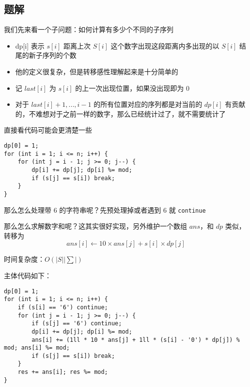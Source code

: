 \subsection{题解}
\begin{frame} %
我们先来看一个子问题：如何计算有多少个不同的子序列

\begin{itemize}
    \item dp[i] 表示 $s[i]$ 距离上次 $S[i]$ 这个数字出现这段距离内多出现的以 $S[i]$ 结尾的新子序列的个数
    \item 他的定义很复杂，但是转移感性理解起来是十分简单的
    \item 记 $last[i]$ 为 $s[i]$ 的上一次出现位置，如果没出现即为 $0$
    \item 对于 $last[i] + 1, ..., i - 1$ 的所有位置对应的序列都是对当前的 $dp[i]$ 有贡献的，不难想对于之前一样的数字，那么已经统计过了，就不需要统计了
\end{itemize}
\end{frame}


\begin{frame}[fragile]
直接看代码可能会更清楚一些

\begin{lstlisting}[style=C++]
dp[0] = 1;
for (int i = 1; i <= n; i++) {
    for (int j = i - 1; j >= 0; j--) {
        dp[i] += dp[j]; dp[i] %= mod;
        if (s[j] == s[i]) break;
    }
}
\end{lstlisting}
那么怎么处理带 $6$ 的字符串呢？先预处理掉或者遇到 $6$ 就 \texttt{continue}
\end{frame}


\begin{frame}
那么怎么求解数字和呢？这其实很好实现，另外维护一个数组 $ans$，和 $dp$ 类似，转移为
$$
ans[i]\leftarrow 10\times ans[j] + s[i]\times dp[j]
$$

时间复杂度：$O(|S||\sum|)$
\end{frame}


\begin{frame}[fragile]
主体代码如下：
\begin{lstlisting}[style=C++]
dp[0] = 1;
for (int i = 1; i <= n; i++) {
    if (s[i] == '6') continue;
    for (int j = i - 1; j >= 0; j--) {
        if (s[j] == '6') continue;
        dp[i] += dp[j]; dp[i] %= mod;
        ans[i] += (1ll * 10 * ans[j] + 1ll * (s[i] - '0') * dp[j]) % mod; ans[i] %= mod;
        if (s[j] == s[i]) break;
    }
    res += ans[i]; res %= mod;
}
\end{lstlisting}
\end{frame}
